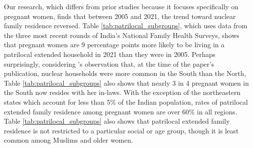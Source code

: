 \documentclass[10pt,twoside,reqno]{article}
\begin{document}
Our research, which differs from prior studies because it focuses specifically on pregnant women, finds that between 2005 and 2021, the trend toward nuclear family residence reversed. Table \ref{tab:patrilocal_subgroups}, which uses data from the three most recent rounds of India's National Family Health Surveys, shows that pregnant women are 9 percentage points more likely to be living in a patrilocal extended household in 2021 than they were in 2005.  Perhaps surprisingly, considering \cite{dyson1983kinship}'s observation that, at the time of the paper's publication, nuclear households were more common in the South than the North, Table \ref{tab:patrilocal_subgroups} also shows that nearly 3 in 4 pregnant women in the South now resides with her in-laws.  With the exception of the northeastern states which account for less than 5\% of the Indian population, rates of patrilocal extended family residence among pregnant women are over 60\% in all regions.  Table \ref{tab:patrilocal_subgroups} also shows that patrilocal extended family residence is not restricted to a particular social or age group, though it is least common among Muslims and older women.




\end{document}
